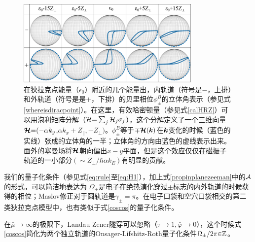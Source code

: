 \begin{figure}
	\includegraphics[width=0.8\textwidth]{../figures/blochsphere.png}
	\centering
	\caption{在狄拉克点能量（$\epsilon_0$）附近的几个能量出，内轨道（符号是$-$，上排）和外轨道（符号是是$+$，下排）的贝里相位$\phi_{\pm}^B$的立体角表示（参见式\ref{whereisdiracpoint}）。在这里，有效哈密顿量（参见式\ref{calHRZ}）可以用泡利矩阵分解（${\cal H}{=}\sum_j{\cal H}_j\sigma_j$），这个分解定义了一个三维向量$\boldsymbol{{\cal H}}{=}({-}\alpha k_y$,$\alpha k_x{+}Z_\parallel,{-}Z_\perp)$。$\phi_{\pm}^B$等于${\mp} \boldsymbol{{\cal H}}(\boldsymbol{k})$在$\boldsymbol{k}$变化的时候（蓝色的实线）张成的立体角的一半\cite{berry_quantal_1984}；立体角的方向由蓝色的虚线表示出来。面外的塞曼场将$\boldsymbol{{\cal H}}$朝向偏出$x-y$平面，但是这个效应仅仅在磁振子轨道的一小部分$(\sim Z_{\perp}/\hbar \alpha k_E)$有明显的贡献。\label{fig:blochsphere}}
\end{figure}

我们的量子化条件（参见式\ref{eq:rule}至\ref{eq:H1}），加上式\ref{propinplanezeeman}中的${\cal A}$的形式，可以简洁地表达为
$\Omega_{\pm}$是电子在绝热演化穿过$\pm$标志的内外轨道的时候获得的相位；Maslov修正对于圆轨道是$\gamma_{\pm}{=}\pi$。在电子口袋和空穴口袋相交的第二类狄拉克点模型中，也有类似于式\ref{coscos}的量子化条件\cite{AALG}。

在$\bar{\mu}{\rightarrow} \infty$的极限下，Landau-Zener隧穿可以忽略（$\tau{\rightarrow}1,\bar{\varphi}{\rightarrow}0$），这个时候式\ref{coscos}简化为两个独立轨道的Onsager-Lifshitz-Roth量子化条件$\Omega_{\pm}/2\pi{\in}\mathbb{Z}$。

